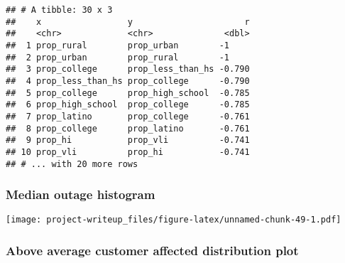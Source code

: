 \documentclass[
]{article}
\newenvironment{Shaded}{\begin{snugshade}}{\end{snugshade}}
\newcommand{\DataTypeTok}[1]{\textcolor[rgb]{0.13,0.29,0.53}{#1}}
\newcommand{\DecValTok}[1]{\textcolor[rgb]{0.00,0.00,0.81}{#1}}
\newcommand{\KeywordTok}[1]{\textcolor[rgb]{0.13,0.29,0.53}{\textbf{#1}}}
\newcommand{\NormalTok}[1]{#1}
\newcommand{\OperatorTok}[1]{\textcolor[rgb]{0.81,0.36,0.00}{\textbf{#1}}}
\newcommand{\StringTok}[1]{\textcolor[rgb]{0.31,0.60,0.02}{#1}}
\begin{document}
\begin{verbatim}
## # A tibble: 30 x 3
##    x                 y                      r
##    <chr>             <chr>              <dbl>
##  1 prop_rural        prop_urban        -1    
##  2 prop_urban        prop_rural        -1    
##  3 prop_college      prop_less_than_hs -0.790
##  4 prop_less_than_hs prop_college      -0.790
##  5 prop_college      prop_high_school  -0.785
##  6 prop_high_school  prop_college      -0.785
##  7 prop_latino       prop_college      -0.761
##  8 prop_college      prop_latino       -0.761
##  9 prop_hi           prop_vli          -0.741
## 10 prop_vli          prop_hi           -0.741
## # ... with 20 more rows
\end{verbatim}

\hypertarget{median-outage-histogram}{%
\subsubsection{Median outage histogram}\label{median-outage-histogram}}

\begin{Shaded}
\end{Shaded}

\texttt{[image: project-writeup\_files/figure-latex/unnamed-chunk-49-1.pdf]}

\hypertarget{above-average-customer-affected-distribution-plot}{%
\subsubsection{Above average customer affected distribution
plot}\label{above-average-customer-affected-distribution-plot}}

\begin{Shaded}
\end{Shaded}
\end{document}
